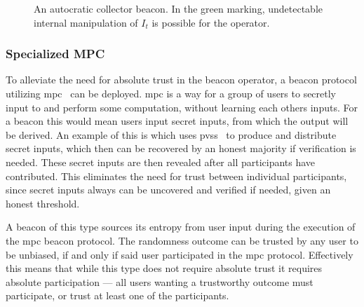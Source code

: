 \begin{figure}[hbt]
    \centering
    \footnotesize
    \caption{An autocratic collector beacon. In the green marking, undetectable internal manipulation of $I_t$ is possible for the operator.}\label{fig:autocratic_beacon}
\end{figure}

\subsubsection{Specialized MPC}\label{ssub:specialized_mpc}
To alleviate the need for absolute trust in the beacon operator, a beacon protocol utilizing \acrfull{mpc}~\cite{goldreich1998secure} can be deployed. \gls{mpc} is a way for a group of users to secretly input to and perform some computation, without learning each others inputs.
For a beacon this would mean users input secret inputs, from which the output will be derived.
An example of this is  which uses \gls{pvss}~\cite{stadler1996publicly} to produce and distribute secret inputs, which then can be recovered by an honest majority if verification is needed.
These secret inputs are then revealed after all participants have contributed.
This eliminates the need for trust between individual participants, since secret inputs always can be uncovered and verified if needed, given an honest threshold.

A beacon of this type sources its entropy from user input during the execution of the \gls{mpc} beacon protocol.
The randomness outcome can be trusted by any user to be unbiased, if and only if said user participated in the \gls{mpc} protocol.
Effectively this means that while this type does not require absolute trust it requires absolute participation --- all users wanting a trustworthy outcome must participate, or trust at least one of the participants.

